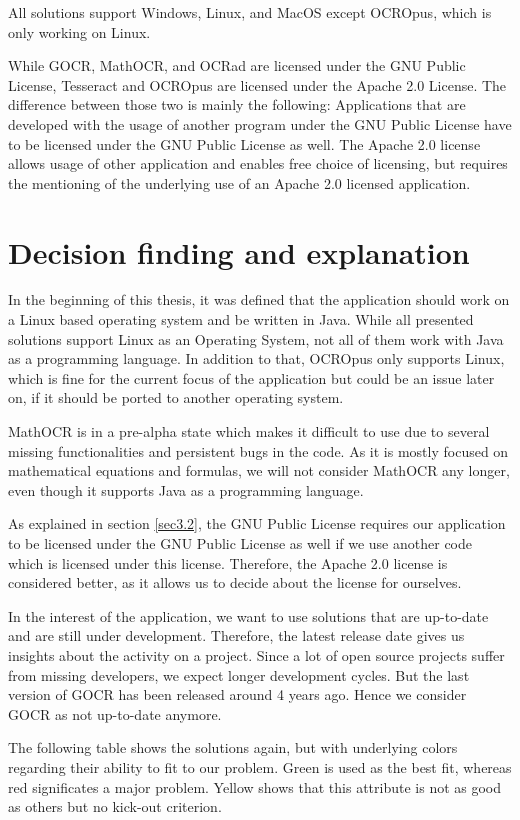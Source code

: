 All solutions support Windows, Linux, and MacOS except OCROpus, which is only working on Linux.

While GOCR, MathOCR, and OCRad are licensed under the GNU Public License, Tesseract and OCROpus are licensed under the Apache 2.0 License. The difference between those two is mainly the following: Applications that are developed with the usage of another program under the GNU Public License have to be licensed under the GNU Public License as well. The Apache 2.0 license allows usage of other application and enables free choice of licensing, but requires the mentioning of the underlying use of an Apache 2.0 licensed application.


\label{OCRDecision}
\section{Decision finding and explanation}
In the beginning of this thesis, it was defined that the application should work on a Linux based operating system and be written in Java. While all presented solutions support Linux as an Operating System, not all of them work with Java as a programming language. In addition to that, OCROpus only supports Linux, which is fine for the current focus of the application but could be an issue later on, if it should be ported to another operating system.

MathOCR is in a pre-alpha state which makes it difficult to use due to several missing functionalities and persistent bugs in the code. As it is mostly focused on mathematical equations and formulas, we will not consider MathOCR any longer, even though it supports Java as a programming language. 

As explained in section \ref{sec3.2}, the GNU Public License requires our application to be licensed under the GNU Public License as well if we use another code which is licensed under this license. Therefore, the Apache 2.0 license is considered better, as it allows us to decide about the license for ourselves.

In the interest of the application, we want to use solutions that are up-to-date and are still under development. Therefore, the latest release date gives us insights about the activity on a project. Since a lot of open source projects suffer from missing developers, we expect longer development cycles. But the last version of GOCR has been released around 4 years ago. Hence we consider GOCR as not up-to-date anymore.

The following table shows the solutions again, but with underlying colors regarding their ability to fit to our problem. Green is used as the best fit, whereas red significates a major problem. Yellow shows that this attribute is not as good as others but no kick-out criterion. 

